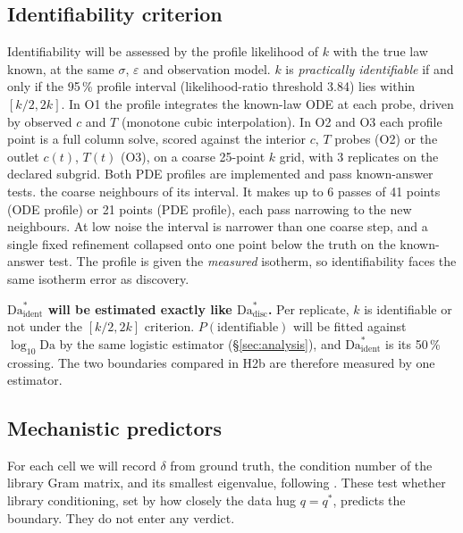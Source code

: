 \documentclass[11pt]{article}
\newcommand{\Da}{\mathrm{Da}}
\newcommand{\qs}{q^{*}}
\begin{document}
\subsection{Identifiability criterion}
\label{sec:ident}
Identifiability will be assessed by the profile likelihood of $k$ \citep{raue2009} with
the true law known, at the same $\sigma$, $\varepsilon$ and observation model.
$k$ is \emph{practically identifiable} if and only if the 95\,\% profile interval
(likelihood-ratio threshold 3.84) lies within $[k/2, 2k]$. In O1 the profile integrates the
known-law ODE at each probe, driven by observed $c$ and $T$ (monotone cubic interpolation).
In O2 and O3 each profile point is a full column solve, scored against the interior $c$,
$T$ probes (O2) or the outlet $c(t)$, $T(t)$ (O3), on a coarse 25-point $k$ grid, with 3
replicates on the declared subgrid. Both PDE profiles are implemented and pass
known-answer tests.
the coarse neighbours of its interval. It makes up to 6 passes of 41 points (ODE profile)
or 21 points (PDE profile), each pass narrowing to the new neighbours. At low noise the
interval is narrower than one coarse step, and a single fixed refinement collapsed onto one
point below the truth on the known-answer test. The profile is given the \emph{measured}
isotherm, so identifiability faces the same isotherm error as discovery.

\textbf{$\Da^{*}_{\mathrm{ident}}$ will be estimated exactly like $\Da^{*}_{\mathrm{disc}}$.}
Per replicate, $k$ is identifiable or not under the $[k/2, 2k]$ criterion.
$P(\text{identifiable})$ will be fitted against $\log_{10}\Da$ by the same logistic
estimator (\S\ref{sec:analysis}), and $\Da^{*}_{\mathrm{ident}}$ is its 50\,\% crossing.
The two boundaries compared in H2b are therefore measured by one estimator.

\subsection{Mechanistic predictors}
\label{sec:mech}
For each cell we will record $\delta$ from ground truth, the condition number of the
library Gram matrix, and its smallest eigenvalue, following
\citep{gallo2026,stanhope2014}. These test whether library conditioning, set by how
closely the data hug $q = \qs$, predicts the boundary. They do not enter any verdict.
\end{document}
